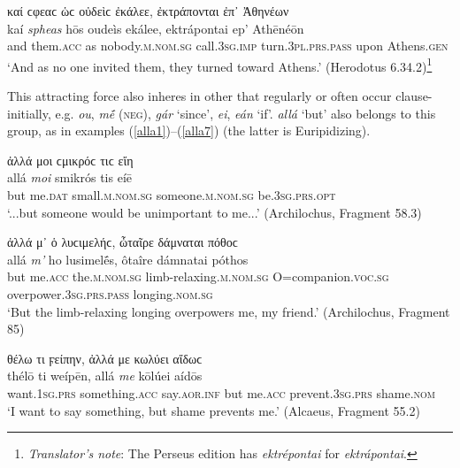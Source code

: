\begin{exe}
\ex καί ϲφεαϲ ὡϲ οὐδεὶϲ ἐκάλεε, ἐκτράπονται ἐπ᾽ Ἀθηνέων\\
\gll kaí \emph{spheas} hōs oudeìs ekálee, ektrápontai ep' Athēnéōn\\
and them.\textsc{acc} as nobody.\textsc{m.nom.sg} call.\textsc{3sg.imp} turn.\textsc{3pl.prs.pass} upon Athens.\textsc{gen}\\
\trans `And as no one invited them, they turned toward Athens.' (Herodotus 6.34.2)\footnote{\emph{Translator's note}: The Perseus edition has \textit{ektrépontai} for \textit{ektrápontai}.}
\label{kaispheas2}
\end{exe}
\clearpage

This attracting force also inheres in other  that regularly or often occur clause-initially, e.g. \textit{ou}, \textit{mḗ} (\textsc{neg}), \textit{gár} `since', \textit{ei}, \textit{eán} `if'. \textit{allá} `but' also belongs to this group, as in examples (\ref{alla1})--(\ref{alla7}) (the latter is Euripidizing).

\begin{exe}
\ex ἀλλά μοι ϲμικρόϲ τιϲ εἴη\\
\gll allá \emph{moi} smikrós tis eíē\\
but me.\textsc{dat} small.\textsc{m.nom.sg} someone.\textsc{m.nom.sg} be.\textsc{3sg.prs.opt}\\
\trans `...but someone would be unimportant to me...' (Archilochus, Fragment 58.3)
\label{alla1}
\end{exe}

\begin{exe}
\ex ἀλλά μ᾽ ὁ λυϲιμελήϲ, ὦταῖρε δάμναται πόθοϲ\\
\gll allá \emph{m'} ho lusimelḗs, ôtaîre dámnatai póthos\\
but me.\textsc{acc} the.\textsc{m.nom.sg} limb-relaxing.\textsc{m.nom.sg} O=companion.\textsc{voc.sg} overpower.\textsc{3sg.prs.pass} longing.\textsc{nom.sg}\\
\trans `But the limb-relaxing longing overpowers me, my friend.' (Archilochus, Fragment 85)
\label{alla2}
\end{exe}

\begin{exe}
\ex θέλω τι ϝείπην, ἀλλά με κωλύει αἴδωϲ\\
\gll thélō ti weípēn, allá \emph{me} kōlúei aídōs\\
want.\textsc{1sg.prs} something.\textsc{acc} say.\textsc{aor.inf} but me.\textsc{acc} prevent.\textsc{3sg.prs} shame.\textsc{nom}\\
\trans `I want to say something, but shame prevents me.' (Alcaeus, Fragment 55.2)
\label{alla3}
\end{exe}

